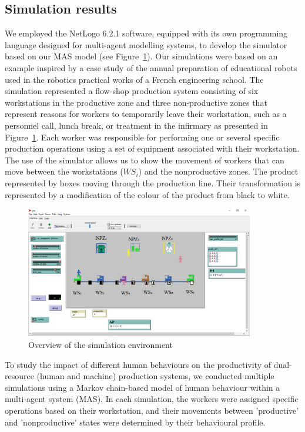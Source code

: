 \documentclass[review,12pt, 3p, times]{elsarticle}
\begin{document}
\subsection{Simulation results}
We employed the NetLogo 6.2.1 software, equipped with its own programming language designed for multi-agent modelling systems, to develop the simulator based on our MAS model (see Figure~\ref{fig:simulator}). Our simulations were based on an example inspired by a case study of the annual preparation of educational robots used in the robotics practical works of a French engineering school. The simulation represented a flow-shop production system consisting of six workstations in the productive zone and three non-productive zones that represent reasons for workers to temporarily leave their workstation, such as a personnel call, lunch break, or treatment in the infirmary as presented in Figure~\ref{fig:simulator}. Each worker was responsible for performing one or several specific production operations using a set of equipment associated with their workstation. The use of the simulator allows us to show the movement of workers that can move between the workstations ($WS_i$) and the nonproductive zones. The product represented by boxes moving through the production line. Their transformation is represented by a modification of the colour of the product from black to white.
\begin{figure}[htbp]
	\centering
	\includegraphics[width=10cm]{simulation.png}
	\caption{Overview of the simulation environment}
	\label{fig:simulator}
\end{figure}
		
To study the impact of different human behaviours on the productivity of dual-resource (human and machine) production systems, we conducted multiple simulations using a Markov chain-based model of human behaviour within a multi-agent system (MAS). In each simulation, the workers were assigned specific operations based on their workstation, and their movements between 'productive' and 'nonproductive' states were determined by their behavioural profile.
	
\end{document}
